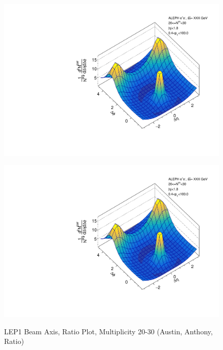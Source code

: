 \begin{figure}[htbp]
  \caption{LEP1 Beam Axis, Ratio Plot, Multiplicity 20-30 (Austin, Anthony, Ratio)}
  \begin{minipage}[b]{0.32\linewidth}
    \centering
    \includegraphics[width=\linewidth]{images/TwoParticleCorrelation/LEP1_BEAM/LEP1_BEAM_ratio1_20_30.pdf}
    \label{fig:LEP1 Beam Axis, Ratio Plot, Multiplicity 20-30, Austin}
  \end{minipage}
  \hspace{0.0cm}
  \begin{minipage}[b]{0.32\linewidth}
    \centering
    \includegraphics[width=\linewidth]{images/TwoParticleCorrelation/LEP1_BEAM/LEP1_BEAM_ratio2_20_30.pdf}
    \label{fig:LEP1 Beam Axis, Ratio Plot, Multiplicity 20-30, Anthony}

\end{minipage}
\end{figure}

